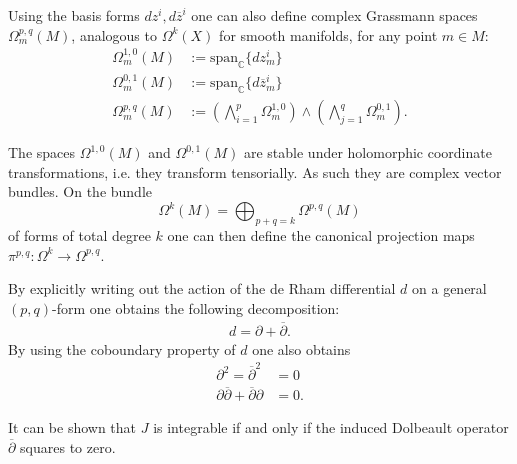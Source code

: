    Using the basis forms $dz^i, d\overline{z}^i$ one can also define complex Grassmann spaces $\Omega^{p, q}_m(M)$, analogous to $\Omega^k(X)$ for smooth manifolds, for any point $m\in M$:
    \begin{align}
        \Omega^{1, 0}_m(M) &:= \text{span}_{\mathbb{C}}\{dz^i_m\}\\
        \Omega^{0, 1}_m(M) &:= \text{span}_{\mathbb{C}}\{d\overline{z}^i_m\}\\
        \Omega^{p, q}_m(M) &:= \left(\bigwedge_{i=1}^p\Omega^{1, 0}_m\right)\wedge\left(\bigwedge_{j=1}^q\Omega^{0, 1}_m\right).
    \end{align}

    \begin{property}
        The spaces $\Omega^{1, 0}(M)$ and $\Omega^{0, 1}(M)$ are stable under holomorphic coordinate transformations, i.e. they transform tensorially. As such they are complex vector bundles. On the bundle \[\Omega^k(M) = \bigoplus_{p+q=k}\Omega^{p, q}(M)\] of forms of total degree $k$ one can then define the canonical projection maps $\pi^{p, q}:\Omega^k\rightarrow\Omega^{p, q}$.
    \end{property}

    \begin{property}
        By explicitly writing out the action of the de Rham differential $d$ on a general $(p, q)$-form one obtains the following decomposition:
        \begin{gather}
            d = \partial + \overline{\partial}.
        \end{gather}
        By using the coboundary property of $d$ one also obtains
        \begin{align}
            \partial^2 = \overline{\partial}^2 &= 0\\
            \partial\overline{\partial} + \overline{\partial}\partial &= 0.
        \end{align}
    \end{property}
    \begin{remark}
        It can be shown that $J$ is integrable if and only if the induced Dolbeault operator $\overline{\partial}$ squares to zero.
    \end{remark}

